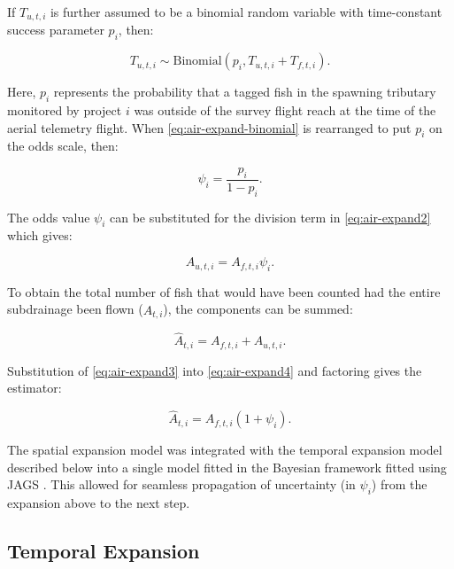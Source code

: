 \documentclass[12pt,]{book}
\theoremstyle{definition}
\theoremstyle{definition}
\theoremstyle{definition}
\theoremstyle{remark}
\begin{document}
\noindent
If \(T_{u,t,i}\) is further assumed to be a binomial random variable
with time-constant success parameter \(p_i\), then:

\begin{equation}
  T_{u,t,i} \sim \text{Binomial}(p_i,T_{u,t,i} + T_{f,t,i}).
  \label{eq:air-expand-binomial}
\end{equation}

\noindent
Here, \(p_i\) represents the probability that a tagged fish in the
spawning tributary monitored by project \(i\) was outside of the survey
flight reach at the time of the aerial telemetry flight. When
\eqref{eq:air-expand-binomial} is rearranged to put \(p_i\) on the odds
scale, then:

\begin{equation}
  \psi_i=\frac{p_i}{1-p_i}.
  \label{eq:air-expand-odds}
\end{equation}

\noindent
The odds value \(\psi_i\) can be substituted for the division term in
\eqref{eq:air-expand2} which gives:

\begin{equation}
  A_{u,t,i} = A_{f,t,i} \psi_i.
  \label{eq:air-expand3}
\end{equation}

\noindent
To obtain the total number of fish that would have been counted had the
entire subdrainage been flown (\(\hat{A}_{t,i}\)), the components can be
summed:

\begin{equation}
  \hat{A}_{t,i} = A_{f,t,i} + A_{u,t,i}.
  \label{eq:air-expand4}
\end{equation}

\noindent
Substitution of \eqref{eq:air-expand3} into \eqref{eq:air-expand4} and
factoring gives the estimator:

\begin{equation}
  \hat{A}_{t,i}=A_{f,t,i}(1 + \psi_i).
  \label{eq:air-expand-final}
\end{equation}

\noindent
The spatial expansion model was integrated with the temporal expansion
model described below into a single model fitted in the Bayesian
framework fitted using JAGS \citep{plummer-2017}. This allowed for
seamless propagation of uncertainty (in \(\psi_i\)) from the expansion
above to the next step.

\subsection{Temporal Expansion}\label{temp-expansion}
\end{document}

